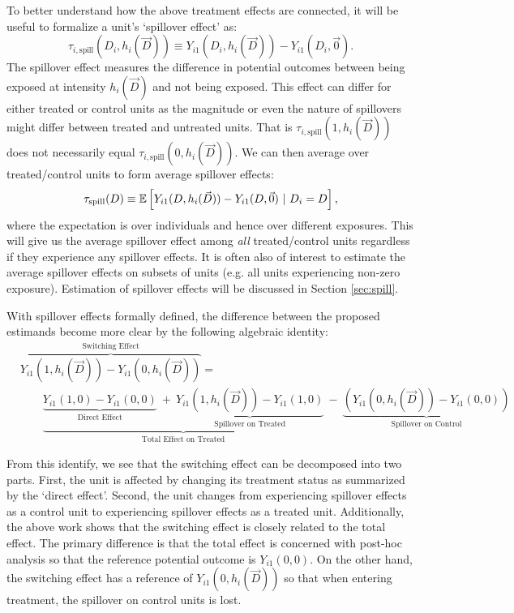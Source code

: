 \documentclass[11pt]{article}
\begin{document}
To better understand how the above treatment effects are connected, it will be useful to formalize a unit's `spillover effect' as:
\[
    \tau_{i, \text{spill}}(D_i, h_i(\vec{D})) \equiv Y_{i1}(D_i, h_i(\vec{D})) - Y_{i1}(D_i, \vec{0}).
\] 
The spillover effect measures the difference in potential outcomes between being exposed at intensity $h_i(\vec{D})$ and not being exposed. This effect can differ for either treated or control units as the magnitude or even the nature of spillovers might differ between treated and untreated units. That is $\tau_{i, \text{spill}}(1, h_i(\vec{D}))$ does not necessarily equal $\tau_{i, \text{spill}}(0, h_i(\vec{D}))$. We can then average over treated/control units to form average spillover effects: 
\[
    \tau_{\text{spill}}(D) \equiv \mathbb{E}\left[Y_{i1}(D, h_i(\vec{D})) - Y_{i1}(D, \vec{0}) \ \vert \ D_i = D\right],
\]
where the expectation is over individuals and hence over different exposures. This will give us the average spillover effect among \emph{all} treated/control units regardless if they experience any spillover effects. It is often also of interest to estimate the average spillover effects on subsets of units (e.g. all units experiencing non-zero exposure). Estimation of spillover effects will be discussed in Section \ref{sec:spill}.

With spillover effects formally defined, the difference between the proposed estimands become more clear by the following algebraic identity:
\begin{align*}
    &\overbrace{Y_{i1}(1, h_i(\vec{D})) - Y_{i1}(0, h_i(\vec{D}))}^{\text{Switching Effect}} = \\
    &\quad\quad \underbrace{\underbrace{Y_{i1}(1, 0) - Y_{i1}(0,0)}_{\text{Direct Effect}} \ + \ \underbrace{Y_{i1}(1, h_i(\vec{D})) - Y_{i1}(1, 0)}_{\text{Spillover on Treated}}}_{\text{Total Effect on Treated}} \ - \ \underbrace{(Y_{i1}(0, h_i(\vec{D})) - Y_{i1}(0,0))}_{\text{Spillover on Control}} 
\end{align*}

From this identify, we see that the switching effect can be decomposed into two parts. First, the unit is affected by changing its treatment status as summarized by the `direct effect'. Second, the unit changes from experiencing spillover effects as a control unit to experiencing spillover effects as a treated unit. Additionally, the above work shows that the switching effect is closely related to the total effect. The primary difference is that the total effect is concerned with post-hoc analysis so that the reference potential outcome is $Y_{i1}(0,0)$. On the other hand, the switching effect has a reference of $Y_{i1}(0, h_i(\vec{D}))$ so that when entering treatment, the spillover on control units is lost.
\end{document}
